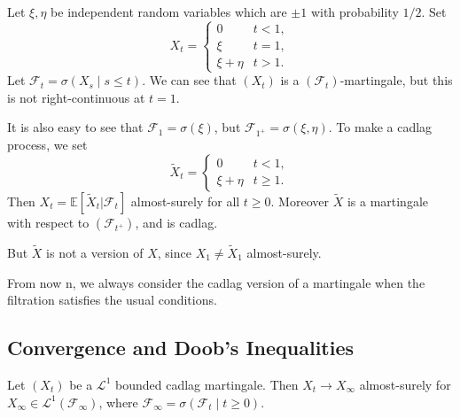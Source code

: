 \documentclass[12pt]{article}
\begin{document}
\begin{exbox}
	Let $\xi, \eta$ be independent random variables which are $\pm1$ with probability $1/2$. Set
	\[
	X_t = 
	\begin{cases}
		0 & t < 1, \\
		\xi & t = 1, \\
		\xi + \eta & t > 1.
	\end{cases}
	\]
	Let $\mathcal{F}_t = \sigma(X_s \mid s \leq t)$. We can see that $(X_t)$ is a $(\mathcal{F}_t)$-martingale, but this is not right-continuous at $t = 1$.

	It is also easy to see that $\mathcal{F}_1 = \sigma(\xi)$, but $\mathcal{F}_{1^+} = \sigma(\xi, \eta)$. To make a cadlag process, we set
	\[
	\tilde X_t =
	\begin{cases}
		0 & t < 1,\\
		\xi + \eta & t \geq 1.
	\end{cases}
	\]
	Then $X_t = \mathbb{E}[\tilde X_t | \mathcal{F}_t]$ almost-surely for all $t \geq 0$. Moreover $\tilde X$ is a martingale with respect to $(\mathcal{F}_{t^+})$, and is cadlag.

	But $\tilde X$ is not a version of $X$, since $X_1 \neq \tilde X_1$ almost-surely.
\end{exbox}

From now n, we always consider the cadlag version of a martingale when the filtration satisfies the usual conditions.

\subsection{Convergence and Doob's Inequalities}%
\label{sub:con_doob}

\begin{theorem}
	Let $(X_t)$ be a $\mathcal{L}^1$ bounded cadlag martingale. Then $X_t \to X_\infty$ almost-surely for $X_\infty \in \mathcal{L}^1(\mathcal{F}_\infty)$, where $\mathcal{F}_\infty = \sigma(\mathcal{F}_t \mid t \geq 0)$.
\end{theorem}
\end{document}

